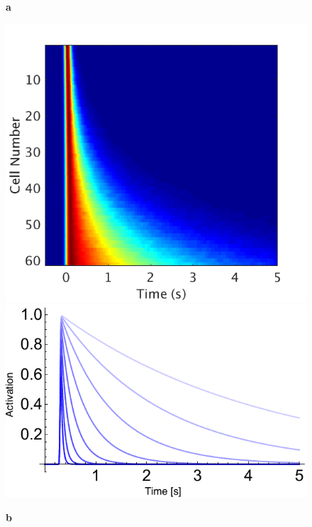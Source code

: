 \documentclass{apa}
\begin{document}
\begin{figure}
	\begin{minipage}{.25\linewidth}
		\textbf{a}
		\begin{center}
			\includegraphics[width=.99\linewidth]{figs/HeatmapExpDecayV2.png}
			\includegraphics[width=.99\linewidth]{figs/ExpDecParams.pdf}
		\end{center}
	\end{minipage}
	\begin{minipage}{.25\linewidth}
		\textbf{b}

\end{minipage}
\end{figure}
\end{document}
